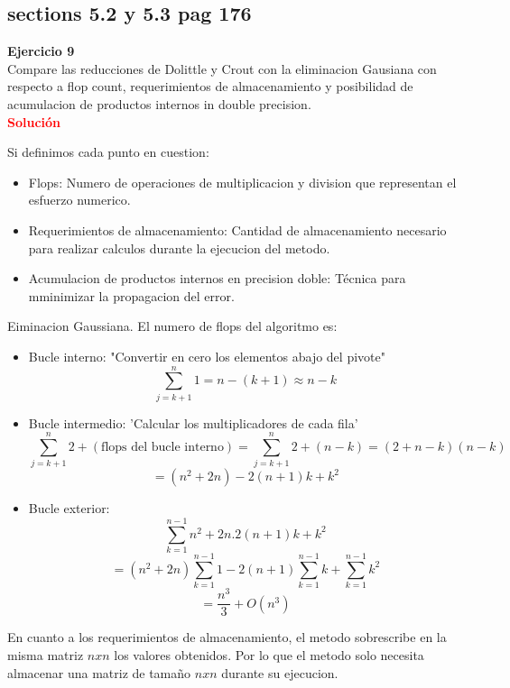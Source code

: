 \documentclass[12pt]{article}
\begin{document}
\subsection{sections 5.2 y 5.3  pag 176}
\noindent \textbf{Ejercicio 9}\\

Compare las reducciones de Dolittle y Crout con la eliminacion Gausiana con respecto a flop count, requerimientos de almacenamiento y posibilidad de acumulacion de productos internos in double precision.\\

\noindent \textcolor{red}{\bf Soluci\'on}

Si definimos cada punto en cuestion:
\begin{itemize}
    \item Flops: Numero de operaciones de multiplicacion y division que representan el esfuerzo numerico.
    \item Requerimientos de almacenamiento: Cantidad de almacenamiento necesario para realizar calculos durante la ejecucion del metodo.
    \item Acumulacion de productos internos en precision doble: Técnica para mminimizar la propagacion del error.
\end{itemize}

Eiminacion Gaussiana.
El numero de flops del algoritmo es:
\begin{itemize}
    \item Bucle interno: "Convertir en cero los elementos abajo del pivote"
    $$\sum_{j=k+1}^{n}1=n-(k+1)\approx n-k$$
    \item Bucle intermedio: 'Calcular los multiplicadores de cada fila'
    $$\sum_{j=k+1}^{n}2+( \text{flops del bucle interno})=\sum_{j=k+1}^{n}2+(n-k)= (2+n-k)(n-k)$$
    $$=(n^2+2n)-2(n+1)k+k^2$$
    \item Bucle exterior: 
    $$\sum_{k=1}^{n-1}n^2+2n.2(n+1)k+k^2$$
    $$=(n^2+2n)\sum_{k=1}^{n-1}1-2(n+1)\sum_{k=1}^{n-1}k+\sum_{k=1}^{n-1}k^2$$
    $$=\frac{n^3}{3} + O(n^3)$$
\end{itemize}
En cuanto a los requerimientos de almacenamiento, el metodo sobrescribe en la misma matriz $nxn$ los valores obtenidos. Por lo que el metodo solo necesita almacenar una matriz de tamaño $nxn$ durante su ejecucion.
\end{document}
